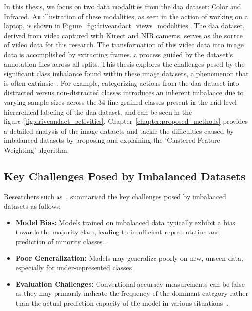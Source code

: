 In this thesis, we focus on two data modalities from the \gls{daa} dataset: Color and Infrared. An illustration of these modalities, as seen in the action of working on a laptop, is shown in Figure~\ref{fig:driveandact_views_modalities}. The \gls{daa} dataset, derived from video captured with Kinect and NIR cameras, serves as the source of video data for this research. The transformation of this video data into image data is accomplished by extracting frames, a process guided by the dataset's annotation files across all splits. This thesis explores the challenges posed by the significant class imbalance found within these image datasets, a phenomenon that is often extrinsic~\citet{5128907Haibo_Imbalance}. For example, categorizing actions from the \gls{daa} dataset into distracted versus non-distracted classes introduces an inherent imbalance due to varying sample sizes across the 34 fine-grained classes present in the mid-level hierarchical labeling of the \gls{daa} dataset, and can be seen in the figure~\ref{fig:driveandact_activities}. Chapter~\ref{chapter:proposed_methods} provides a detailed analysis of the image datasets and tackle the difficulties caused by imbalanced datasets by proposing and explaining the `Clustered Feature Weighting' algorithm.

\subsection{Key Challenges Posed by Imbalanced Datasets}
Researchers such as~\citep{5128907Haibo_Imbalance, Survey_DL_Taghi_article}, summarised the key challenges posed by imbalanced datasets as follows:
\begin{itemize}
    \item \textbf{Model Bias:} Models trained on imbalanced data typically exhibit a bias towards the majority class, leading to insufficient representation and prediction of minority classes~\citep{imbalance_kC_rawat2022review, 5128907Haibo_Imbalance}.
    \item \textbf{Poor Generalization:} Models may generalize poorly on new, unseen data, especially for under-represented classes~\citep{5128907Haibo_Imbalance, Survey_DL_Taghi_article}.
    \item \textbf{Evaluation Challenges:} Conventional accuracy measurements can be false as they may primarily indicate the frequency of the dominant category rather than the actual prediction capacity of the model in various situations~\citep{5128907Haibo_Imbalance, Survey_DL_Taghi_article}.
\end{itemize}

